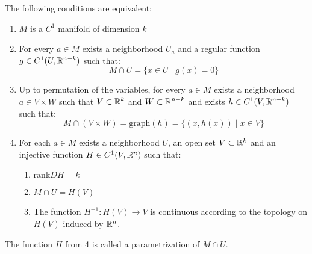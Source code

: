 \documentclass[11pt,a4paper]{article}
\begin{document}
\begin{proposition}
  The following conditions are equivalent:
  \begin{enumerate}
    \item $M$ is a $C^1$ manifold of dimension $k$
    \item For every $a \in M$ exists a neighborhood $U_a$ and a 
    regular function $g \in C^1(U,\mathbb{R}^{n-k})$ such that:
    \[
      M \cap U = \{x \in U \mid g(x) = 0\}
    \]
    \item Up to permutation of the variables, for every $a \in M$
    exists a neighborhood $a \in V \times W$ such that 
    $V \subset \mathbb{R}^k$ and $W \subset \mathbb{R}^{n-k}$ and exists
    $h \in C^1(V, \mathbb{R}^{n-k})$ such that:
    \[
      M \cap (V \times W) = \mathrm{graph}(h) = 
      \{(x,h(x)) \mid x \in V\}
    \]
    \item For each $a \in M$ exists a neighborhood $U$, an open
    set $V \subset \mathbb{R}^k$ and an injective function $H \in C^1(V,\mathbb{R}^n)$
    such that:
    \begin{enumerate}
    \item $\mathrm{rank} DH = k$
    \item $M \cap U = H(V)$
    \item The function $H^{-1} \colon H(V) \to V$ is continuous
    according to the topology on $H(V)$ induced by $\mathbb{R}^n$.
    \end{enumerate}
  \end{enumerate}
\end{proposition}
\begin{remark}
  The function $H$ from 4 is called a parametrization of $M \cap U$.
\end{remark}
\end{document}
